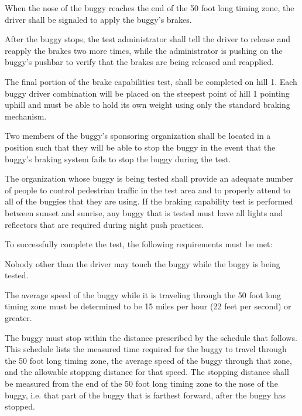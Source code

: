 	When the nose of the buggy reaches the end of the 50 foot long timing zone, the
	driver shall be signaled to apply the buggy's brakes.

	After the buggy stops, the test administrator shall tell the driver to release
	and reapply the brakes two more times, while the administrator is pushing on
	the buggy's pushbar to verify that the brakes are being released and reapplied.

	The final portion of the brake capabilities test, shall be completed on hill 1.
	Each buggy driver combination will be placed on the steepest point of hill 1
	pointing uphill and must be able to hold its own weight using only the standard
	braking mechanism.

	Two members of the buggy's sponsoring organization shall be located in a
	position such that they will be able to stop the buggy in the event that the
	buggy's braking system fails to stop the buggy during the test.

	The organization whose buggy is being tested shall provide an adequate number
	of people to control pedestrian traffic in the test area and to properly attend
	to all of the buggies that they are using. If the braking capability test is
	performed between sunset and sunrise, any buggy that is tested must have all
	lights and reflectors that are required during night push practices.

	To successfully complete the test, the following requirements must be met:

	Nobody other than the driver may touch the buggy while the buggy is being
	tested.

	The average speed of the buggy while it is traveling through the 50 foot long
	timing zone must be determined to be 15 miles per hour (22 feet per second) or
	greater.

	The buggy must stop within the distance prescribed by the schedule that
	follows. This schedule lists the measured time required for the buggy to travel
	through the 50 foot long timing zone, the average speed of the buggy through
	that zone, and the allowable stopping distance for that speed. The stopping
	distance shall be measured from the end of the 50 foot long timing zone to the
	nose of the buggy, i.e. that part of the buggy that is farthest forward, after
	the buggy has stopped.

